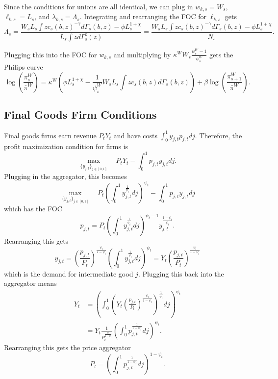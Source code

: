 Since the conditions for unions are all identical, we can plug in $w_{k, s} = W_s$, $\ell_{k, s} = L_s$, and $\lambda_{k, s} = \Lambda_s$. Integrating and rearranging the FOC for $\ell_{k, s}$ gets
\begin{equation*}
    \Lambda_s = \frac{W_s L_s \int z c_s (b, z)^{-\gamma} d \Gamma_s(b, z) - \phi L_s^{1 + \chi}}{L_s \int z d\Gamma_s^z (z)} = \frac{W_s L_s \int z c_s (b, z)^{-\gamma} d \Gamma_s(b, z) - \phi L_s^{1 + \chi}}{N_s}.
\end{equation*}

Plugging this into the FOC for $w_{k, s}$ and multiplying by $\kappa^W W_s \frac{\psi_s^W - 1}{\psi_s^W}$ gets the Philips curve
\begin{equation*}
    \log \left(\frac{\pi_s^W}{\overline{\pi}^W}\right) = \kappa^W \left(\phi L_s^{1 + \chi} - \frac{1}{\psi^W_s} W_s L_s \int z c_s(b, z) d\Gamma_s (b, z)\right) + \beta \log \left(\frac{\pi_{s+1}^W}{\overline{\pi}^W}\right).
\end{equation*}


\subsection{Final Goods Firm Conditions}

Final goods firms earn revenue $P_t Y_t$ and have costs $\int_0^1 y_{j, t} p_{j, t} dj$. Therefore, the profit maximization condition for firms is
\begin{equation*}
    \max_{\{y_{j, t}\}_{j \in [0, 1]}} \quad P_t Y_t - \int_0^1 p_{j, t} y_{j, t} dj.
\end{equation*}
Plugging in the aggregator, this becomes
\begin{equation*}
    \max_{\{y_{j, t}\}_{j \in [0, 1]}} \quad P_t \left( \int_0^1 y_{j, t}^\frac{1}{\psi_t} dj \right)^{\psi_t} - \int_0^1 p_{j, t} y_{j, t} dj
\end{equation*}
which has the FOC
\begin{equation*}
    p_{j, t} = P_t \left( \int_0^1 y_{j, t}^\frac{1}{\psi_t} dj \right)^{\psi_t - 1} y_{j, t}^\frac{1 - \psi_t}{\psi_t}.
\end{equation*}
Rearranging this gets
\begin{equation*}
    y_{j, t} = \left( \frac{p_{j, t}}{P_t} \right)^\frac{\psi_t}{1 - \psi_t} \left( \int_0^1 y_{j, t}^\frac{1}{\psi_t} dj \right)^{\psi_t} = Y_t \left( \frac{p_{j, t}}{P_t} \right)^\frac{\psi_t}{1 - \psi_t}   
\end{equation*}
which is the demand for intermediate good $j$. Plugging this back into the aggregator means
\begin{align*}
    Y_t &= \left( \int_0^1 \left(Y_t \left( \frac{p_{j, t}}{P_t} \right)^\frac{\psi_t}{1 - \psi_t}\right)^\frac{1}{\psi_t} dj \right)^{\psi_t} \\
    &= Y_t \frac{1}{P_t^\frac{\psi_t}{1 - \psi_t}} \left( \int_0^1 p_{j, t}^\frac{1}{1 - \psi_t} dj \right)^{\psi_t}.
\end{align*}
Rearranging this gets the price aggregator
\begin{equation*}
    P_t = \left(\int_0^1 p_{j, t}^\frac{1}{1 - \psi_t} dj \right)^{1 - \psi_t}.
\end{equation*}


